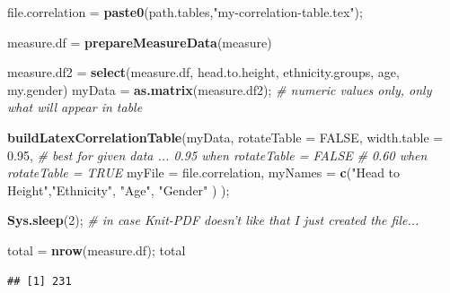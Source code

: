 \documentclass[]{article}
\newenvironment{Shaded}{\begin{snugshade}}{\end{snugshade}}
\newcommand{\CommentTok}[1]{\textcolor[rgb]{0.56,0.35,0.01}{\textit{#1}}}
\newcommand{\DataTypeTok}[1]{\textcolor[rgb]{0.13,0.29,0.53}{#1}}
\newcommand{\DecValTok}[1]{\textcolor[rgb]{0.00,0.00,0.81}{#1}}
\newcommand{\FloatTok}[1]{\textcolor[rgb]{0.00,0.00,0.81}{#1}}
\newcommand{\KeywordTok}[1]{\textcolor[rgb]{0.13,0.29,0.53}{\textbf{#1}}}
\newcommand{\NormalTok}[1]{#1}
\newcommand{\OperatorTok}[1]{\textcolor[rgb]{0.81,0.36,0.00}{\textbf{#1}}}
\newcommand{\OtherTok}[1]{\textcolor[rgb]{0.56,0.35,0.01}{#1}}
\newcommand{\StringTok}[1]{\textcolor[rgb]{0.31,0.60,0.02}{#1}}
\begin{document}
\begin{Shaded}
\begin{Highlighting}[]
\NormalTok{file.correlation =}\StringTok{ }\KeywordTok{paste0}\NormalTok{(path.tables,}\StringTok{"my-correlation-table.tex"}\NormalTok{);}

\NormalTok{measure.df =}\StringTok{ }\KeywordTok{prepareMeasureData}\NormalTok{(measure)}

\NormalTok{measure.df2 =}\StringTok{ }\KeywordTok{select}\NormalTok{(measure.df, head.to.height, ethnicity.groups, age, my.gender)}
\NormalTok{myData =}\StringTok{ }\KeywordTok{as.matrix}\NormalTok{(measure.df2);  }\CommentTok{# numeric values only, only what will appear in table}

\KeywordTok{buildLatexCorrelationTable}\NormalTok{(myData, }
  \DataTypeTok{rotateTable =} \OtherTok{FALSE}\NormalTok{,}
  \DataTypeTok{width.table =} \FloatTok{0.95}\NormalTok{, }\CommentTok{# best for given data ... 0.95 when rotateTable = FALSE}
                      \CommentTok{# 0.60 when rotateTable = TRUE}
  \DataTypeTok{myFile =}\NormalTok{ file.correlation,}
  \DataTypeTok{myNames =} \KeywordTok{c}\NormalTok{(}\StringTok{"Head to Height"}\NormalTok{,}\StringTok{"Ethnicity"}\NormalTok{, }\StringTok{"Age"}\NormalTok{, }\StringTok{"Gender"}\NormalTok{ ) );}


\KeywordTok{Sys.sleep}\NormalTok{(}\DecValTok{2}\NormalTok{); }\CommentTok{# in case Knit-PDF doesn't like that I just created the file...}
\end{Highlighting}
\end{Shaded}

\begin{Shaded}
\begin{Highlighting}[]
\NormalTok{total =}\StringTok{ }\KeywordTok{nrow}\NormalTok{(measure.df); total}
\end{Highlighting}
\end{Shaded}

\begin{verbatim}
## [1] 231
\end{verbatim}

\begin{Shaded}
\end{Shaded}
\end{document}
